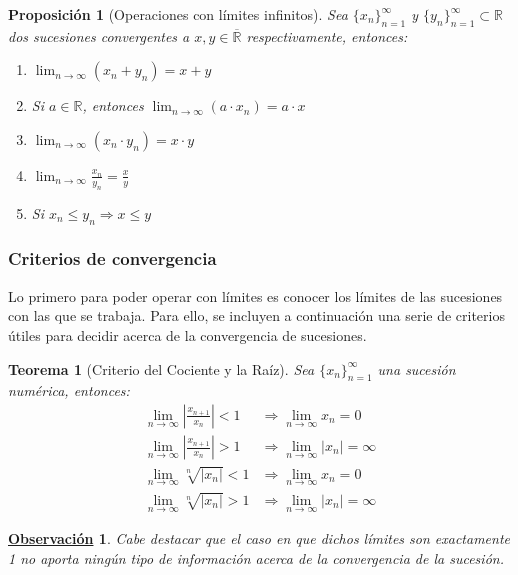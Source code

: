 \documentclass[10pt,a4paper,openright]{book}
\theoremstyle{break}
\newtheorem{theo}{Teorema}[chapter]
\newtheorem{prop}{Proposición}[chapter]
\newtheorem{obs}{\underline{Observación}}[chapter]
\begin{document}
\begin{prop}[Operaciones con límites infinitos]
Sea $\{x_n\}_{n=1}^\infty$ y $\{y_n\}_{n=1}^\infty\subset \mathbb R$ dos sucesiones convergentes a $x,y\in \overline{\mathbb R}$ respectivamente, entonces:
\begin{enumerate}
\item $\lim_{n\rightarrow \infty}(x_n+y_n)=x+y$
\item Si $a\in \mathbb R$, entonces $\lim_{n\rightarrow \infty} (a\cdot x_n)=a\cdot x$
\item $\lim_{n\rightarrow \infty}(x_n\cdot y_n)=x\cdot y$
\item $\lim_{n\rightarrow \infty}\frac{x_n}{y_n}=\frac{x}{y}$
\item Si $x_n\leq y_n \Rightarrow x\leq y$
\end{enumerate}
\end{prop}

\subsubsection{Criterios de convergencia}
Lo primero para poder operar con límites es conocer los límites de las sucesiones con las que se trabaja. Para ello, se incluyen a continuación una serie de criterios útiles para decidir acerca de la convergencia de sucesiones.

\begin{theo}[Criterio del Cociente y la Raíz]
Sea $\{x_n\}_{n=1}^\infty$ una sucesión numérica, entonces:
\begin{align*}
\lim_{n\rightarrow \infty}\left|\frac{x_{n+1}}{x_n}\right|<1 &\Rightarrow \lim_{n\rightarrow \infty} x_n=0 \\
\lim_{n\rightarrow \infty}\left|\frac{x_{n+1}}{x_n}\right|>1 &\Rightarrow \lim_{n\rightarrow \infty} |x_n|=\infty \\
\lim_{n\rightarrow \infty}\sqrt[n]{|x_n|}<1 &\Rightarrow \lim_{n\rightarrow \infty} x_n=0\\
\lim_{n\rightarrow \infty}\sqrt[n]{|x_n|}>1 &\Rightarrow \lim_{n\rightarrow \infty} |x_n|=\infty
\end{align*}
\end{theo}

\begin{obs}
	Cabe destacar que el caso en que dichos límites son exactamente 1 no aporta ningún tipo de información acerca de la convergencia de la sucesión.
\end{obs}
\end{document}
